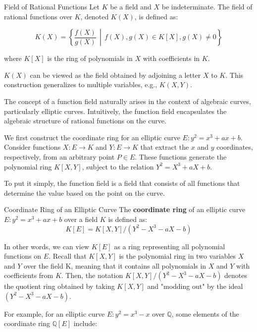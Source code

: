 \documentclass{article}
\begin{document}
\begin{definition}{Field of Rational Functions}{}
Let $K$ be a field and $X$ be indeterminate. The field of rational functions over $K$, denoted $K(X)$, is defined as:

\begin{equation*}
    K(X) = \left\{ \frac{f(X)}{g(X)} \,\middle|\, f(X), g(X) \in K[X], g(X) \neq 0 \right\}
\end{equation*}

where $K[X]$ is the ring of polynomials in $X$ with coefficients in $K$.
\end{definition}

$K(X)$ can be viewed as the field obtained by adjoining a letter $X$ to $K$. This construction generalizes to multiple variables, e.g., $K(X,Y)$.

The concept of a function field naturally arises in the context of algebraic curves, particularly elliptic curves. Intuitively, the function field encapsulates the algebraic structure of rational functions on the curve.

We first construct the coordinate ring for an elliptic curve $E: y^2 = x^3 + ax + b$. Consider functions $X: E \to K$ and $Y: E \to K$ that extract the $x$ and $y$ coordinates, respectively, from an arbitrary point $P \in E$. These functions generate the polynomial ring $K[X,Y]$, subject to the relation $Y^2 = X^3 + aX + b$.

To put it simply, the function field is a field that consists of all functions that determine the value based on the point on the curve.

\begin{definition}{Coordinate Ring of an Elliptic Curve}{}
The \textbf{coordinate ring} of an elliptic curve $E: y^2 = x^3 + ax + b$ over a field $K$ is defined as:
\begin{equation}
    K[E] = K[X, Y]/(Y^2 - X^3 - aX - b)
\end{equation}
\end{definition}

In other words, we can view $K[E]$ as a ring representing all polynomial functions on $E$. Recall that $K[X, Y]$ is the polynomial ring in two variables $X$ and $Y$ over the field K, meaning that it contains all polynomials in $X$ and $Y$ with coefficients from $K$. Then, the notation $K[X, Y]/(Y^2 - X^3 - aX - b)$ denotes the quotient ring obtained by taking $K[X, Y]$ and "modding out" by the ideal $(Y^2 - X^3 - aX - b)$.

For example, for an elliptic curve $E: y^2 = x^3 - x$ over $\mathbb{Q}$, some elements of the coordinate ring $\mathbb{Q}[E]$ include:
\end{document}
